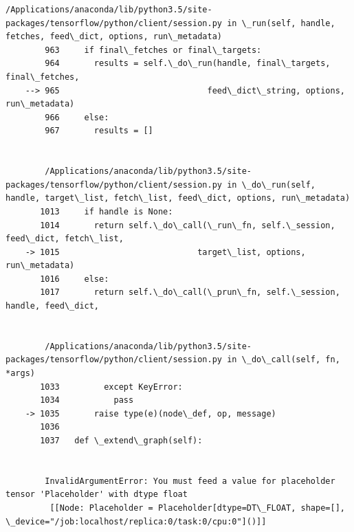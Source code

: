 \documentclass[11pt]{article}
\begin{document}
\begin{Verbatim}[commandchars=\\\{\}]
        /Applications/anaconda/lib/python3.5/site-packages/tensorflow/python/client/session.py in \_run(self, handle, fetches, feed\_dict, options, run\_metadata)
        963     if final\_fetches or final\_targets:
        964       results = self.\_do\_run(handle, final\_targets, final\_fetches,
    --> 965                              feed\_dict\_string, options, run\_metadata)
        966     else:
        967       results = []


        /Applications/anaconda/lib/python3.5/site-packages/tensorflow/python/client/session.py in \_do\_run(self, handle, target\_list, fetch\_list, feed\_dict, options, run\_metadata)
       1013     if handle is None:
       1014       return self.\_do\_call(\_run\_fn, self.\_session, feed\_dict, fetch\_list,
    -> 1015                            target\_list, options, run\_metadata)
       1016     else:
       1017       return self.\_do\_call(\_prun\_fn, self.\_session, handle, feed\_dict,


        /Applications/anaconda/lib/python3.5/site-packages/tensorflow/python/client/session.py in \_do\_call(self, fn, *args)
       1033         except KeyError:
       1034           pass
    -> 1035       raise type(e)(node\_def, op, message)
       1036 
       1037   def \_extend\_graph(self):


        InvalidArgumentError: You must feed a value for placeholder tensor 'Placeholder' with dtype float
    	 [[Node: Placeholder = Placeholder[dtype=DT\_FLOAT, shape=[], \_device="/job:localhost/replica:0/task:0/cpu:0"]()]]
    

\end{Verbatim}
\end{document}
